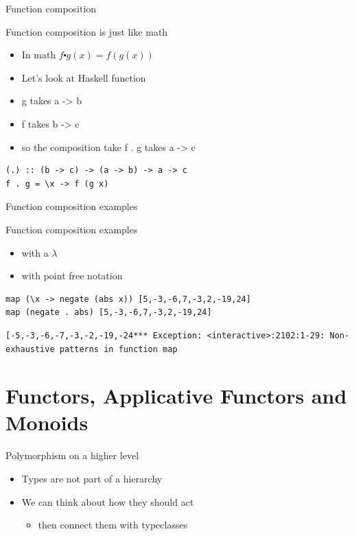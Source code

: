 \documentclass[presetation]{beamer}
\begin{document}
\begin{frame}[fragile,label={sec:org46e4f88}]{Function composition}
 \begin{block}{Function composition is just like math}
\begin{itemize}
\item In math  \(f \centerdot g(x) = f(g(x))\)
\item Let's look at Haskell function
\item g takes a -> b
\item f takes b -> c
\end{itemize}
\pause
\begin{itemize}
\item so the composition take f . g takes a -> c
\end{itemize}
\begin{verbatim}
(.) :: (b -> c) -> (a -> b) -> a -> c
f . g = \x -> f (g x)
\end{verbatim}
\end{block}
\end{frame}

\begin{frame}[fragile,label={sec:org4c0be89}]{Function composition examples}
 \begin{block}{Function composition examples}
\begin{itemize}
\item with a \(\lambda\)
\item with point free notation
\end{itemize}
\begin{verbatim}
map (\x -> negate (abs x)) [5,-3,-6,7,-3,2,-19,24]
map (negate . abs) [5,-3,-6,7,-3,2,-19,24]
\end{verbatim}

\begin{verbatim}
[-5,-3,-6,-7,-3,-2,-19,-24*** Exception: <interactive>:2102:1-29: Non-exhaustive patterns in function map
\end{verbatim}
\end{block}
\end{frame}

\section{Functors, Applicative Functors and Monoids}
\label{sec:org11ee899}
\begin{frame}[label={sec:org9406db1}]{Polymorphism on a higher level}
\begin{itemize}
\item Types are not part of a hierarchy
\item We can think about how they should act
\begin{itemize}
\item then connect them with typeclasses
\end{itemize}
\end{itemize}
\end{frame}
\end{document}
